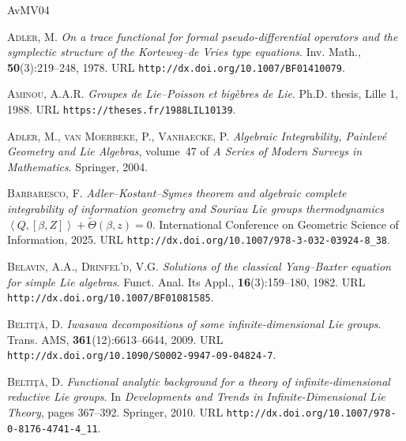 \documentclass[a4paper,12pt,reqno]{amsart}%
\theoremstyle{definition}
\theoremstyle{remark}
\numberwithin{theorem}{section}
\numberwithin{equation}{section}
\newcommand{\1}{{\bf 1}}
\begin{document}
\begin{thebibliography}{AvMV04}
\providecommand{\url}[1]{\texttt{#1}}
\providecommand{\urlprefix}{URL }

\textsc{Adler, M.}
\newblock \emph{On a trace functional for formal pseudo-differential operators
  and the symplectic structure of the {K}orteweg--de {V}ries type equations}.
\newblock Inv. Math., \textbf{50}(3):219--248, 1978.
\newblock \urlprefix\url{http://dx.doi.org/10.1007/BF01410079}.

\textsc{Aminou, A.A.R.}
\newblock \emph{Groupes de {L}ie--{P}oisson et big{\`e}bres de {L}ie}.
\newblock Ph.D. thesis, Lille 1, 1988.
\newblock \urlprefix\url{https://theses.fr/1988LIL10139}.

\textsc{Adler, M.}, \textsc{van Moerbeke, P.}, \textsc{Vanhaecke, P.}
\newblock \emph{Algebraic Integrability, {P}ainlev\'e Geometry and {L}ie
  Algebras}, volume~47 of \emph{A Series of Modern Surveys in Mathematics}.
\newblock Springer, 2004.

\textsc{Barbaresco, F.}
\newblock \emph{{A}dler--{K}ostant--{S}ymes theorem and algebraic complete
  integrability of information geometry and {S}ouriau {L}ie groups
  thermodynamics $\left\langle {Q,\left[ {\beta ,Z} \right]} \right\rangle +
  \tilde{\Theta }\left( {\beta ,z} \right) = 0$}.
\newblock International Conference on Geometric Science of Information, 2025.
\newblock \urlprefix\url{http://dx.doi.org/10.1007/978-3-032-03924-8_38}.

\textsc{Belavin, A.A.}, \textsc{Drinfel'd, V.G.}
\newblock \emph{Solutions of the classical {Y}ang--{B}axter equation for simple
  {L}ie algebras}.
\newblock Funct. Anal. Its Appl., \textbf{16}(3):159--180, 1982.
\newblock \urlprefix\url{http://dx.doi.org/10.1007/BF01081585}.

\textsc{Belti{\c{t}}{\u{a}}, D.}
\newblock \emph{Iwasawa decompositions of some infinite-dimensional {L}ie
  groups}.
\newblock Trans. AMS, \textbf{361}(12):6613--6644, 2009.
\newblock \urlprefix\url{http://dx.doi.org/10.1090/S0002-9947-09-04824-7}.

\textsc{Belti{\c{t}}{\u{a}}, D.}
\newblock \emph{Functional analytic background for a theory of
  infinite-dimensional reductive {L}ie groups}.
\newblock In \emph{Developments and Trends in Infinite-Dimensional Lie Theory},
  pages 367--392. Springer, 2010.
\newblock \urlprefix\url{http://dx.doi.org/10.1007/978-0-8176-4741-4_11}.


\end{thebibliography}
\end{document}
